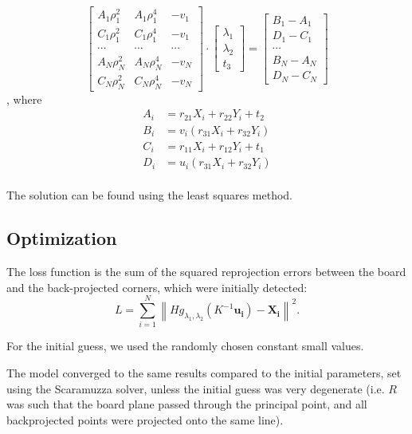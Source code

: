 \begin{equation}
	\begin{bmatrix}
		A_1 \rho_1^{2} & A_1 \rho_1^{4} & -v_1   \\
		C_1 \rho_1^{2} & C_1 \rho_1^{4} & -v_1   \\
		\cdots         & \cdots         & \cdots \\
		A_N \rho_N^{2} & A_N \rho_N^{4} & -v_N   \\
		C_N \rho_N^{2} & C_N \rho_N^{4} & -v_N
	\end{bmatrix} \cdot \begin{bmatrix}
		\lambda_1 \\
		\lambda_2 \\
		t_3
	\end{bmatrix} = \begin{bmatrix}
		B_1 - A_1 \\
		D_1 - C_1 \\
		\cdots    \\
		B_N - A_N \\
		D_N - C_N
	\end{bmatrix}
\end{equation},
where
\begin{align}
	A_i & = r_{21} X_i + r_{22} Y_i + t_2 \\
	B_i & = v_i (r_{31} X_i + r_{32} Y_i) \\
	C_i & = r_{11} X_i + r_{12} Y_i + t_1 \\
	D_i & = u_i (r_{31} X_i + r_{32} Y_i) \\
\end{align}

The solution can be found using the least squares method.

\subsection{Optimization}\label{sub:optimization}

The loss function is the sum of the squared reprojection errors between the board and
the back-projected corners, which were initially detected:
\begin{equation}
	L = \sum_{i=1}^{N} \left\lVert
	H g_{\lambda_1, \lambda_2}(K^{-1} \mathbf{u_i}) -
	\mathbf{X_i} \right\rVert^2.
\end{equation}

For the initial guess, we used the randomly chosen constant small values.

The model converged to the same results compared to the initial parameters, set
using the Scaramuzza solver, unless the initial guess was very degenerate (i.e.
\(R\) was such that the board plane passed through the principal point, and all
backprojected points were projected onto the same line).

